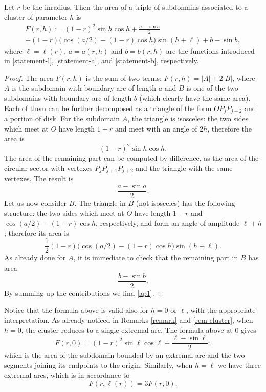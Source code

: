 \begin{lemma}\label{lem-F} Let $r$ be the inradius. Then the area of a triple of subdomains associated to a cluster of parameter $h$ is
\begin{multline}\label{ap1}
F(r,h):=(1-r)^2 \sin h \cos h +\frac{a-\sin a}{2}\\
+(1-r) \bigl(\cos(a/2)-(1-r)\cos h\bigr) \sin(h+\ell) +b-\sin b,
\end{multline}
where $\ell=\ell(r)$, $a=a(r,h)$ and $b=b(r,h)$ are the functions introduced in \eqref{statement-l}, \eqref{statement-a}, and \eqref{statement-b}, respectively.
\end{lemma}
\begin{proof} The area $F(r,h)$ is the sum of two terms: $F(r,h)=|A|+2|B|$, where $A$ is the subdomain with boundary arc of length $a$ and $B$ is one of the two subdomains with boundary arc of length $b$ (which clearly have the same area).
Each of them can be further decomposed as a triangle of the form $OP_jP_{j+2}$ and a portion of disk.
For the subdomain $A$, the triangle is isosceles: the two sides which meet at $O$ have length $1-r$ and meet with an angle of $2h$, therefore the area is
\[
(1-r)^2\sin h \cos h.
\]
The area of the remaining part can be computed by difference, as the area of the circular sector with vertexes $P_jP_{j+1}P_{j+2}$ and the triangle with the same vertexes. The result is
\[
\frac{a-\sin a}{2}.
\]
Let us now consider $B$. The triangle in $B$ (not isosceles) has the following structure: the two sides which meet at $O$ have length $1-r$ and $\cos(a/2) - (1-r)\cos h$, respectively, and form an angle of amplitude $\ell + h$; therefore its area is
\[
\frac12 (1-r) \big(\cos(a/2)-(1-r)\cos h\big) \sin(h+\ell).
\]
As already done for $A$, it is immediate to check that the remaining part in $B$ has area
\[
\frac{b-\sin b}{2}.
\]
By summing up the contributions we find \eqref{ap1}. \end{proof}
\begin{remark}\label{maybe}
Notice that the formula above is valid also for $h= 0 $ or $\ell$, with the appropriate interpretation. As already noticed in Remarks \ref{remark} and \ref{rem-cluster}, when $h=0$, the cluster reduces to a single extremal arc. The formula above at 0 gives
\[
F(r,0)=(1-r)^2\sin \ell \cos\ell + \frac{\ell - \sin \ell}{2};
\]
which is the area of the subdomain bounded by an extremal arc and the two segments joining its endpoints to the origin.
Similarly, when $h=\ell$ we have three extremal arcs, which is in accordance to
\[
F(r,\ell(r))=3F(r,0).
\]
\end{remark}

